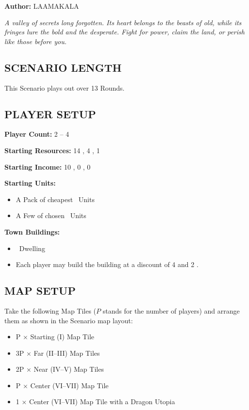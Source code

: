 
\begin{multicols*}{2}

\textbf{Author:} LAAMAKALA

\textit{A valley of secrets long forgotten. Its heart belongs to the beasts of old, while its fringes lure the bold and the desperate. Fight for power, claim the land, or perish like those before you.}

\subsection*{\MakeUppercase{Scenario Length}}
This Scenario plays out over 13 Rounds.

\subsection*{\MakeUppercase{Player Setup}}
\textbf{Player Count:} 2 -- 4

\textbf{Starting Resources:} 14 , 4 , 1 

\textbf{Starting Income:} 10 , 0 , 0 

\textbf{Starting Units:}

\begin{itemize}
  \item A Pack of cheapest \bronze\ Units
  \item A Few  of chosen \bronze\ Units
\end{itemize}

\textbf{Town Buildings:}
\begin{itemize}
  \item \bronze\ Dwelling
  \item Each player may build the  building at a discount of 4  and 2 .
\end{itemize}

\subsection*{\MakeUppercase{Map Setup}}
Take the following Map Tiles ($P$ stands for the number of players) and arrange them as shown in the Scenario map layout:

\begin{itemize}
  \item P × Starting (I) Map Tile
  \item 3P × Far (II–III) Map Tiles
  \item 2P × Near (IV–V) Map Tiles
  \item P × Center (VI–VII) Map Tile
  \item 1 × Center (VI–VII) Map Tile with a Dragon Utopia
\end{itemize}


\end{multicols*}
